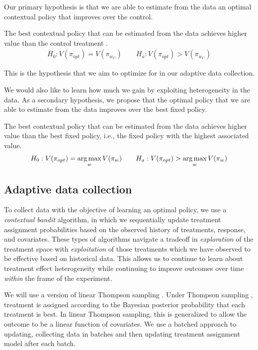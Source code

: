 \documentclass[letterpaper, 12pt, parskip=full,]{scrartcl}
\begin{document}
Our primary hypothesis is that we are able to estimate from the data an optimal contextual policy that improves over the control. 
  \begin{hypothesis}
  The best contextual policy that can be estimated from the data achieves higher value than the control treatment \label{eq:optctr}.
\begin{align}
  H_{0}: V(\pi_{opt}) = V(\pi_{w_{C}}) \qquad H_{a}:  V(\pi_{opt}) > V(\pi_{w_{C}})
\end{align}
\end{hypothesis}
This is the hypothesis that we aim to optimize for in our adaptive data collection. 

We would also like to learn how much we gain by exploiting heterogeneity in the data. As a secondary hypothesis, we propose that the optimal policy that we are able to estimate from the data improves over the best fixed policy. 
  \begin{hypothesis}
  The best contextual policy that can be estimated from the data achieves higher value than the best fixed policy, i.e., the fixed policy with the highest associated value. 
  \label{eq:optmax}
\begin{align}
  H_{0}: V(\pi_{opt}) = \operatorname*{arg\,max}_w V(\pi_{w}) \qquad H_{a}:  V(\pi_{opt}) > \operatorname*{arg\,max}_w V(\pi_{w})
\end{align}
\end{hypothesis}


\subsection{Adaptive data collection}\label{adaptiveagent}

To collect data with the objective of learning an optimal policy, we use a \textit{contextual bandit} algorithm, in which we sequentially update treatment assignment probabilities based on the observed history of treatments, response, and covariates. These types of algorithms navigate a tradeoff in \textit{exploration} of the treatment space with \textit{exploitation} of those treatments which we have observed to be effective based on historical data. This allows us to continue to learn about treatment effect heterogeneity while continuing to improve outcomes over time \textit{within} the frame of the experiment. 

We will use a version of linear Thompson sampling \citep{agrawal2013thompson}. Under Thompson sampling \citep{thompson1933likelihood,thompson1935theory}, treatment is assigned according to the Bayesian posterior probability that each treatment is best. In linear Thompson sampling, this is generalized to allow the outcome to be a linear function of covariates. We use a batched approach to updating, collecting data in batches and then updating treatment assignment model after each batch. 
\end{document}
